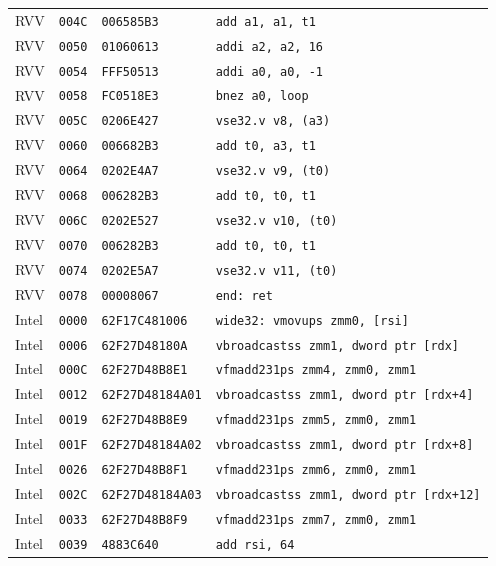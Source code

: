 \begin{table}[htbp]
\begin{tabular}{@{}l|l|l|p{7.2cm}@{}}
RVV & \texttt{004C} & \texttt{006585B3} & \texttt{add a1, a1, t1} \\
RVV & \texttt{0050} & \texttt{01060613} & \texttt{addi a2, a2, 16} \\
RVV & \texttt{0054} & \texttt{FFF50513} & \texttt{addi a0, a0, -1} \\
RVV & \texttt{0058} & \texttt{FC0518E3} & \texttt{bnez a0, loop} \\
RVV & \texttt{005C} & \texttt{0206E427} & \texttt{vse32.v v8, (a3)} \\
RVV & \texttt{0060} & \texttt{006682B3} & \texttt{add t0, a3, t1} \\
RVV & \texttt{0064} & \texttt{0202E4A7} & \texttt{vse32.v v9, (t0)} \\
RVV & \texttt{0068} & \texttt{006282B3} & \texttt{add t0, t0, t1} \\
RVV & \texttt{006C} & \texttt{0202E527} & \texttt{vse32.v v10, (t0)} \\
RVV & \texttt{0070} & \texttt{006282B3} & \texttt{add t0, t0, t1} \\
RVV & \texttt{0074} & \texttt{0202E5A7} & \texttt{vse32.v v11, (t0)} \\
RVV & \texttt{0078} & \texttt{00008067} & \texttt{end: ret} \\
\midrule
Intel & \texttt{0000} & \texttt{62F17C481006} & \texttt{wide32: vmovups zmm0, [rsi]} \\
Intel & \texttt{0006} & \texttt{62F27D48180A} & \texttt{vbroadcastss zmm1, dword ptr [rdx]} \\
Intel & \texttt{000C} & \texttt{62F27D48B8E1} & \texttt{vfmadd231ps zmm4, zmm0, zmm1} \\
Intel & \texttt{0012} & \texttt{62F27D48184A01} & \texttt{vbroadcastss zmm1, dword ptr [rdx+4]} \\
Intel & \texttt{0019} & \texttt{62F27D48B8E9} & \texttt{vfmadd231ps zmm5, zmm0, zmm1} \\
Intel & \texttt{001F} & \texttt{62F27D48184A02} & \texttt{vbroadcastss zmm1, dword ptr [rdx+8]} \\
Intel & \texttt{0026} & \texttt{62F27D48B8F1} & \texttt{vfmadd231ps zmm6, zmm0, zmm1} \\
Intel & \texttt{002C} & \texttt{62F27D48184A03} & \texttt{vbroadcastss zmm1, dword ptr [rdx+12]} \\
Intel & \texttt{0033} & \texttt{62F27D48B8F9} & \texttt{vfmadd231ps zmm7, zmm0, zmm1} \\
Intel & \texttt{0039} & \texttt{4883C640} & \texttt{add rsi, 64} \\

\end{tabular}
\end{table}
